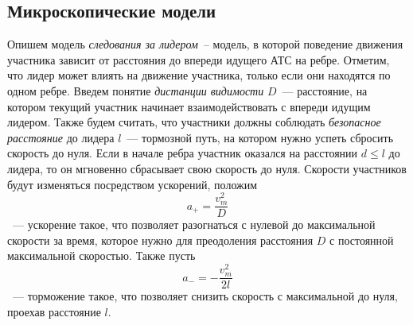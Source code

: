 \documentclass[12pt, a4paper]{article}
\begin{document}
\subsection{Микроскопические модели}
Опишем модель \textit{следования за лидером}~-- модель, в которой поведение движения участника зависит от расстояния до впереди идущего АТС на ребре. Отметим, что лидер может влиять на движение участника, только если они находятся по одном ребре.
Введем понятие \textit{дистанции видимости} $D$~--- расстояние, на котором текущий участник начинает взаимодействовать с впереди идущим лидером. Также будем считать, что участники должны соблюдать \textit{безопасное расстояние} до лидера $l$~--- тормозной путь, на котором нужно успеть сбросить скорость до нуля. Если в начале ребра участник оказался на расстоянии $d \leq l$ до лидера, то он мгновенно сбрасывает свою скорость до нуля. Скорости участников будут изменяться посредством ускорений, положим
$$a_+ = \frac{v^2_m}{D}$$~--- ускорение такое, что позволяет разогнаться с нулевой до максимальной скорости за время, которое нужно для преодоления расстояния $D$ с постоянной максимальной скоростью. 
Также пусть $$a_- = -\frac{v^2_m}{2l}$$~--- торможение такое, что позволяет снизить скорость с максимальной до нуля, проехав расстояние $l$.
\end{document}
